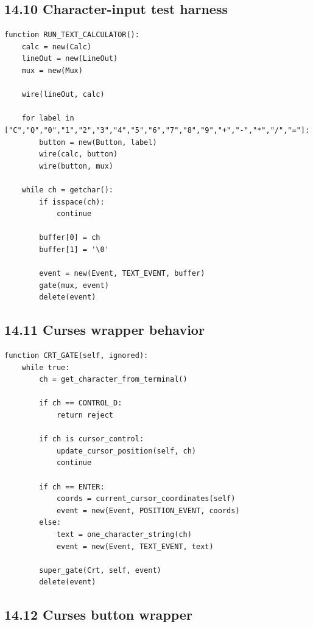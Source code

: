 \documentclass[11pt]{article}
\begin{document}
\subsection{14.10 Character-input test
harness}\label{character-input-test-harness}

\begin{verbatim}
function RUN_TEXT_CALCULATOR():
    calc = new(Calc)
    lineOut = new(LineOut)
    mux = new(Mux)

    wire(lineOut, calc)

    for label in ["C","Q","0","1","2","3","4","5","6","7","8","9","+","-","*","/","="]:
        button = new(Button, label)
        wire(calc, button)
        wire(button, mux)

    while ch = getchar():
        if isspace(ch):
            continue

        buffer[0] = ch
        buffer[1] = '\0'

        event = new(Event, TEXT_EVENT, buffer)
        gate(mux, event)
        delete(event)
\end{verbatim}

\subsection{14.11 Curses wrapper
behavior}\label{curses-wrapper-behavior}

\begin{verbatim}
function CRT_GATE(self, ignored):
    while true:
        ch = get_character_from_terminal()

        if ch == CONTROL_D:
            return reject

        if ch is cursor_control:
            update_cursor_position(self, ch)
            continue

        if ch == ENTER:
            coords = current_cursor_coordinates(self)
            event = new(Event, POSITION_EVENT, coords)
        else:
            text = one_character_string(ch)
            event = new(Event, TEXT_EVENT, text)

        super_gate(Crt, self, event)
        delete(event)
\end{verbatim}

\subsection{14.12 Curses button wrapper}\label{curses-button-wrapper}
\end{document}
